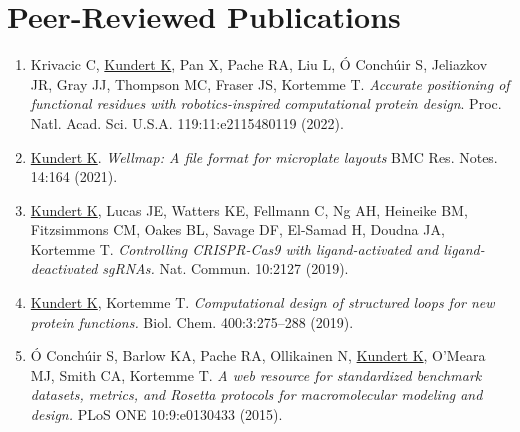 \section{Peer-Reviewed Publications}

\begin{enumerate}

\item Krivacic C, \underline{Kundert K}, Pan X, Pache RA, Liu L, Ó Conchúir S, Jeliazkov JR, Gray JJ, Thompson MC, Fraser JS, Kortemme T.  \emph{Accurate positioning of functional residues with robotics-inspired computational protein design}.  Proc. Natl. Acad. Sci. U.S.A. 119:11:e2115480119 (2022).

\item \underline{Kundert K}. \emph{Wellmap: A file format for microplate layouts}  BMC Res. Notes. 14:164 (2021).

\item \underline{Kundert K}, Lucas JE, Watters KE, Fellmann C, Ng AH, Heineike
    BM, Fitzsimmons CM, Oakes BL, Savage DF, El-Samad H, Doudna JA, Kortemme T.
    \emph{Controlling CRISPR-Cas9 with ligand-activated and ligand-deactivated
    sgRNAs.}  Nat. Commun. 10:2127 (2019).

\item \underline{Kundert K}, Kortemme T.  \emph{Computational design of 
  structured loops for new protein functions.}  Biol. Chem. 400:3:275--288 
  (2019).

\item Ó Conchúir S, Barlow KA, Pache RA, Ollikainen N, \underline{Kundert K}, 
    O'Meara MJ, Smith CA, Kortemme T.  \emph{A web resource for standardized 
        benchmark datasets, metrics, and Rosetta protocols for macromolecular 
        modeling and design.}  PLoS ONE 10:9:e0130433 (2015).

\end{enumerate}



